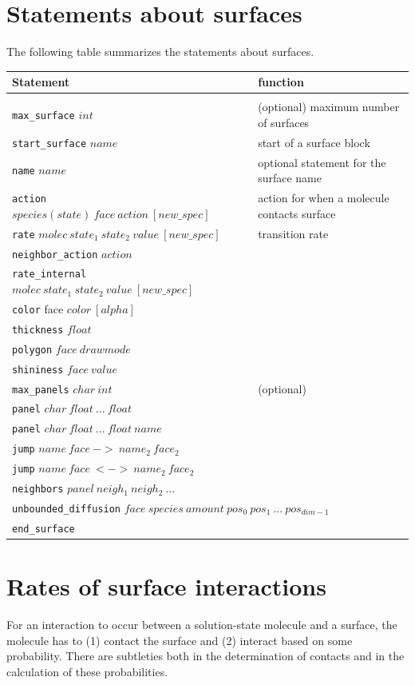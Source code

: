\documentclass {scrbook}
\newcommand {\ttt} {\texttt}
\begin{document}
\section{Statements about surfaces}

The following table summarizes the statements about surfaces.

\begin{longtable}[c]{ll}
Statement & function\\
\hline\\
\ttt{max\_surface} $int$ & (optional) maximum number of surfaces\\
\ttt{start\_surface} $name$ & start of a surface block\\
\ttt{name} $name$ & optional statement for the surface name\\
\ttt{action} $species(state)\ face\ action\ [new\_spec]$ & action for when a molecule contacts surface\\
\ttt{rate} $molec\ state_1\ state_2\ value\ [new\_spec]$ & transition rate\\
\ttt{neighbor\_action} $action$\\
\ttt{rate\_internal} $molec\ state_1\ state_2\ value\ [new\_spec]$\\
\ttt{color} face $color\ [alpha]$\\
\ttt{thickness} $float$\\
\ttt{polygon} $face\ drawmode$\\
\ttt{shininess} $face\ value$\\
\ttt{max\_panels} $char\ int$ & (optional)\\
\ttt{panel} $char\ float\ ...\ float$\\
\ttt{panel} $char\ float\ ...\ float\ name$\\
\ttt{jump} $name\ face\ ->\ name_2\ face_2$\\
\ttt{jump} $name\ face\ <->\ name_2\ face_2$\\
\ttt{neighbors} $panel\ neigh_1\ neigh_2\ ...$\\
\multicolumn{2}{l}{
\ttt{unbounded\_diffusion} $face\ species\ amount\ pos_0\ pos_1\ ...\ pos_{dim-1}$}\\
\ttt{end\_surface}
\end{longtable}

\section{Rates of surface interactions}

For an interaction to occur between a solution-state molecule and a surface, the molecule has to (1) contact the surface and (2) interact based on some probability. There are subtleties both in the determination of contacts and in the calculation of these probabilities.
\end{document}
